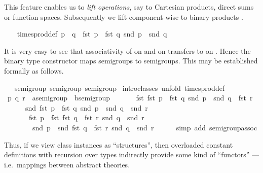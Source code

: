 \begin{isabellebody}
\begin{isamarkuptext}
  This feature enables us to \emph{lift operations}, say to Cartesian
  products, direct sums or function spaces.  Subsequently we lift
  \isa{{\isasymodot}} component-wise to binary products .%
\end{isamarkuptext}%
\isamarkuptrue%
\ {\isacharparenleft}\isanewline
\ \ times{\isacharunderscore}prod{\isacharunderscore}def{\isacharcolon}\ {\isachardoublequote}p\ {\isasymodot}\ q\ {\isasymequiv}\ {\isacharparenleft}fst\ p\ {\isasymodot}\ fst\ q{\isacharcomma}\ snd\ p\ {\isasymodot}\ snd\ q{\isacharparenright}{\isachardoublequote}\isamarkupfalse%
%
\begin{isamarkuptext}%
It is very easy to see that associativity of \isa{{\isasymodot}} on 
  and \isa{{\isasymodot}} on  transfers to \isa{{\isasymodot}} on .  Hence the binary type constructor \isa{{\isasymodot}} maps semigroups
  to semigroups.  This may be established formally as follows.%
\end{isamarkuptext}%
\isamarkuptrue%
\ {\isacharasterisk}\ {\isacharcolon}{\isacharcolon}\ {\isacharparenleft}semigroup{\isacharcomma}\ semigroup{\isacharparenright}\ semigroup\isanewline
\isamarkupfalse%
\ {\isacharparenleft}intro{\isacharunderscore}classes{\isacharcomma}\ unfold\ times{\isacharunderscore}prod{\isacharunderscore}def{\isacharparenright}\isanewline
\ \ \isamarkupfalse%
\ p\ q\ r\ {\isacharcolon}{\isacharcolon}\ {\isachardoublequote}{\isacharprime}a{\isasymColon}semigroup\ {\isasymtimes}\ {\isacharprime}b{\isasymColon}semigroup{\isachardoublequote}\isanewline
\ \ \isamarkupfalse%
\isanewline
\ \ \ \ {\isachardoublequote}{\isacharparenleft}fst\ {\isacharparenleft}fst\ p\ {\isasymodot}\ fst\ q{\isacharcomma}\ snd\ p\ {\isasymodot}\ snd\ q{\isacharparenright}\ {\isasymodot}\ fst\ r{\isacharcomma}\isanewline
\ \ \ \ \ \ snd\ {\isacharparenleft}fst\ p\ {\isasymodot}\ fst\ q{\isacharcomma}\ snd\ p\ {\isasymodot}\ snd\ q{\isacharparenright}\ {\isasymodot}\ snd\ r{\isacharparenright}\ {\isacharequal}\isanewline
\ \ \ \ \ \ \ {\isacharparenleft}fst\ p\ {\isasymodot}\ fst\ {\isacharparenleft}fst\ q\ {\isasymodot}\ fst\ r{\isacharcomma}\ snd\ q\ {\isasymodot}\ snd\ r{\isacharparenright}{\isacharcomma}\isanewline
\ \ \ \ \ \ \ \ snd\ p\ {\isasymodot}\ snd\ {\isacharparenleft}fst\ q\ {\isasymodot}\ fst\ r{\isacharcomma}\ snd\ q\ {\isasymodot}\ snd\ r{\isacharparenright}{\isacharparenright}{\isachardoublequote}\isanewline
\ \ \ \ \isamarkupfalse%
\ {\isacharparenleft}simp\ add{\isacharcolon}\ semigroup{\isachardot}assoc{\isacharparenright}\isanewline
\isamarkupfalse%
\isamarkupfalse%
%
\begin{isamarkuptext}%
Thus, if we view class instances as ``structures'', then overloaded
  constant definitions with recursion over types indirectly provide
  some kind of ``functors'' --- i.e.\ mappings between abstract
  theories.%
\end{isamarkuptext}%
\isamarkuptrue%
\isanewline
\isamarkupfalse%
\end{isabellebody}%
